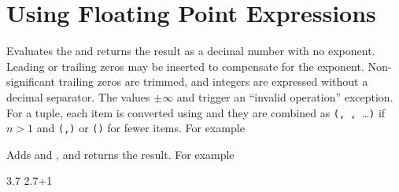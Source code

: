 \documentclass[oneside]{book}
\begin{document}

\section{Using Floating Point Expressions}

\begin{function}{\fpEval}
\begin{syntax}
 
\end{syntax}
Evaluates the  and returns the
result as a decimal number with no
exponent.  Leading or trailing zeros may be inserted to compensate
for the exponent.  Non-significant trailing zeros are trimmed, and
integers are expressed without a decimal separator.  The values
$\pm\infty$ and \nan{} trigger an \enquote{invalid operation}
exception.
For a tuple, each item is converted using  and they are combined as
\verb|(|\verb*|, |\verb*|, |\ldots{}\verb|)|
if $n>1$ and \verb|(|\verb|,)| or \verb|()| for fewer items.
For example
\begin{demohigh}
\end{demohigh}
\end{function}

\begin{function}{\fpMathAdd}
\begin{syntax}
  
\end{syntax}
Adds  and ,
and returns the result. For example
\begin{demohigh}
 {3.7}
 {2.7+1}
\end{demohigh}
\end{function}
\end{document}
